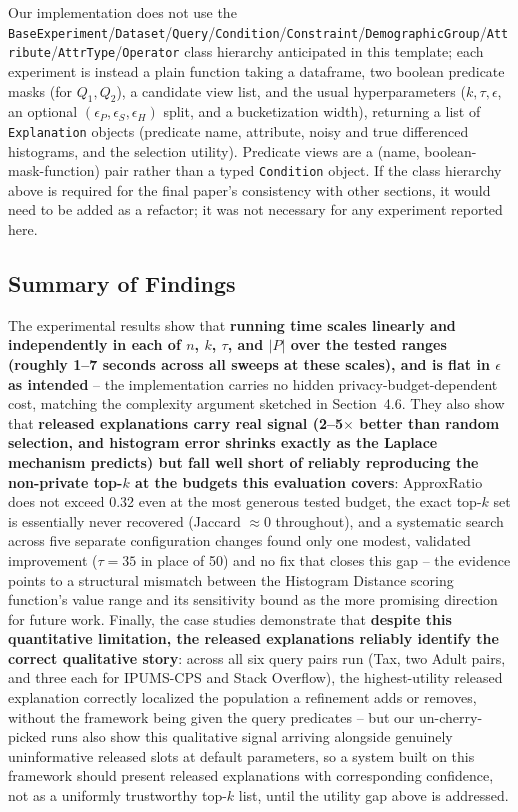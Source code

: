 Our implementation does not use the
\texttt{BaseExperiment}/\texttt{Dataset}/\texttt{Query}/\texttt{Condition}/\texttt{Constraint}/\texttt{DemographicGroup}/\texttt{Attribute}/\texttt{AttrType}/\texttt{Operator}
class hierarchy anticipated in this template; each experiment is instead
a plain function taking a dataframe, two boolean predicate masks (for
$Q_1,Q_2$), a candidate view list, and the usual hyperparameters
($k,\tau,\epsilon$, an optional $(\epsilon_P,\epsilon_S,\epsilon_H)$
split, and a bucketization width), returning a list of \texttt{Explanation}
objects (predicate name, attribute, noisy and true differenced
histograms, and the selection utility). Predicate views are a
(name, boolean-mask-function) pair rather than a typed \texttt{Condition}
object. If the class hierarchy above is required for the final paper's
consistency with other sections, it would need to be added as a
refactor; it was not necessary for any experiment reported here.

\subsection{Summary of Findings}
\label{subsec:experiments-summary}

The experimental results show that \textbf{running time scales linearly
and independently in each of $n$, $k$, $\tau$, and $|P|$ over the tested
ranges (roughly 1--7 seconds across all sweeps at these scales), and is
flat in $\epsilon$ as intended} -- the implementation carries no hidden
privacy-budget-dependent cost, matching the complexity argument sketched
in Section~4.6. They also show that \textbf{released explanations carry
real signal (2--5$\times$ better than random selection, and histogram
error shrinks exactly as the Laplace mechanism predicts) but fall well
short of reliably reproducing the non-private top-$k$ at the budgets this
evaluation covers}: ApproxRatio does not exceed 0.32 even at the most
generous tested budget, the exact top-$k$ set is essentially never
recovered (Jaccard $\approx0$ throughout), and a systematic search across
five separate configuration changes found only one modest, validated
improvement ($\tau{=}35$ in place of 50) and no fix that closes this gap
-- the evidence points to a structural mismatch between the Histogram
Distance scoring function's value range and its sensitivity bound as the
more promising direction for future work. Finally, the case studies
demonstrate that \textbf{despite this quantitative limitation, the
released explanations reliably identify the correct qualitative story}:
across all six query pairs run (Tax, two Adult pairs, and three each for
IPUMS-CPS and Stack Overflow), the highest-utility released explanation
correctly localized the population a refinement adds or removes, without
the framework being given the query predicates -- but our un-cherry-picked
runs also show this qualitative signal arriving alongside genuinely
uninformative released slots at default parameters, so a system built on
this framework should present released explanations with corresponding
confidence, not as a uniformly trustworthy top-$k$ list, until the
utility gap above is addressed.
